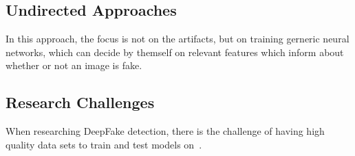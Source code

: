 \subsection{Undirected Approaches}
In this approach, the focus is not on the artifacts, but on training gerneric
neural networks, which can decide by themself on relevant
features which inform about whether or not an image is fake.

\subsection{Research Challenges}
When researching DeepFake detection, there is the challenge of having high
quality data sets to train and test models on~\cite{li_celeb-df_2019}.
